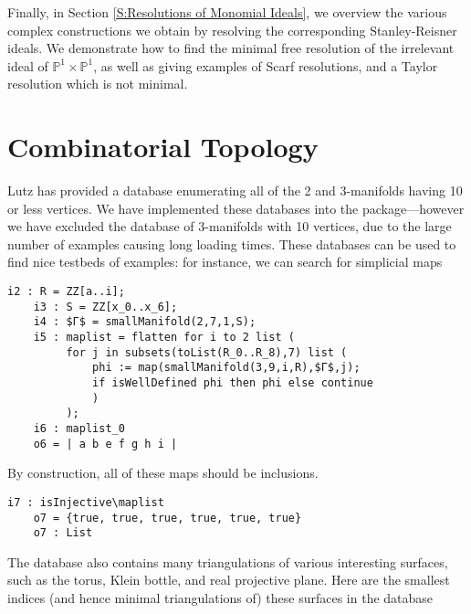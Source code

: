 \documentclass[12pt,leqno]{amsart}
\theoremstyle{definition}
\newenvironment{example}
{\pushQED{\qed}\renewcommand{\qedsymbol}{$\diamond$}\examplex}
{\popQED\endexamplex}
\newcommand{\PP}{\ensuremath{\mathbb{P}}}
\begin{document}
Finally, in Section \ref{S:Resolutions of Monomial Ideals}, we overview the various complex constructions we obtain by resolving the corresponding Stanley-Reisner ideals. We demonstrate how to find the minimal free resolution of the irrelevant ideal of $\PP^1 \times \PP^1$, as well as giving examples of Scarf resolutions, and a Taylor resolution which is not minimal.

\section{Combinatorial Topology}

Lutz has provided a database enumerating all of the 2 and 3-manifolds having 10 or less vertices. We have implemented these databases into the package---however we have excluded the database of 3-manifolds with 10 vertices, due to the large number of examples causing long loading times.
\begin{example}\label{example of using database}
  These databases can be used to find nice testbeds of examples: for instance, we can search for simplicial maps
  \begin{lstlisting}[basicstyle={\ttfamily \scriptsize}, xleftmargin=-23pt]
    i2 : R = ZZ[a..i];
    i3 : S = ZZ[x_0..x_6];
    i4 : $Γ$ = smallManifold(2,7,1,S);
    i5 : maplist = flatten for i to 2 list (
         for j in subsets(toList(R_0..R_8),7) list (
             phi := map(smallManifold(3,9,i,R),$Γ$,j);
             if isWellDefined phi then phi else continue
             )
         );
    i6 : maplist_0
    o6 = | a b e f g h i |
  \end{lstlisting}
  By construction, all of these maps should be inclusions.
  \begin{lstlisting}[basicstyle={\ttfamily \scriptsize}, xleftmargin=-23pt]
    i7 : isInjective\maplist
    o7 = {true, true, true, true, true, true}
    o7 : List
  \end{lstlisting}
\end{example}
The database also contains many triangulations of various interesting surfaces, such as the torus, Klein bottle, and real projective plane. Here are the smallest indices (and hence minimal triangulations of) these surfaces in the database
\end{document}
